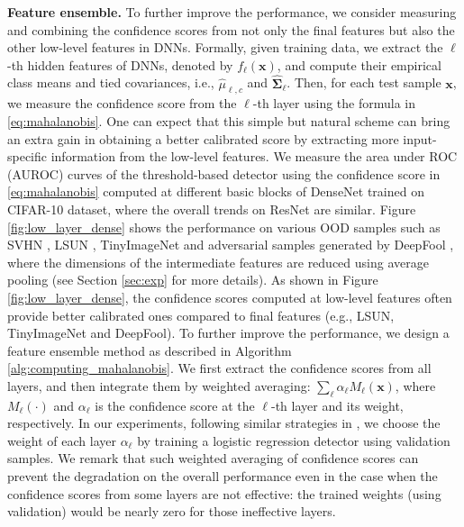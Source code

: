 \documentclass{article}
\begin{document}
{\bf Feature ensemble.}
To further improve the performance,
we consider measuring and combining the confidence scores
from not only the final features but also the other low-level features in DNNs.
Formally, given training data, we extract the $\ell$-th hidden features of DNNs, denoted by $f_{\ell}(\mathbf{x})$, and compute their empirical class means and tied covariances, i.e., ${\widehat \mu}_{\ell,c}$ and $\mathbf{\widehat \Sigma}_\ell$. Then, for each test sample $\mathbf{x}$, we measure the confidence score from the $\ell$-th layer using the formula in \eqref{eq:mahalanobis}.
One can expect that this simple but natural scheme can bring an extra gain in obtaining a better calibrated score by extracting more input-specific information from the low-level features.
We measure the area under ROC (AUROC) curves of the threshold-based detector using the confidence score in \eqref{eq:mahalanobis} computed at different basic blocks of DenseNet \citep{huang2017densely} trained on CIFAR-10 dataset, where the overall trends on ResNet are similar.
Figure \ref{fig:low_layer_dense} shows the performance on various
OOD samples such as {SVHN \citep{netzer2011reading}, LSUN \citep{yu2015lsun}, TinyImageNet 
and adversarial samples generated by DeepFool \citep{moosavi2016deepfool}}, 
where the dimensions of the intermediate features are reduced using average pooling (see Section \ref{sec:exp} for more details).
As shown in Figure \ref{fig:low_layer_dense},
the confidence scores computed at low-level features often provide better calibrated ones compared to final features (e.g., LSUN, TinyImageNet and DeepFool).
To further improve the performance,
we design a feature ensemble method as described in Algorithm \ref{alg:computing_mahalanobis}.
We first extract the confidence scores from all layers, and then integrate them by weighted averaging: $\sum_{\ell} \alpha_\ell M_\ell(\mathbf{x})$, where $M_\ell(\cdot)$ and $\alpha_\ell$ is the confidence score at the $\ell$-th layer and its weight, respectively.
In our experiments, following similar strategies in \citep{ma2018characterizing}, we choose the weight of each layer $\alpha_\ell$ by training a logistic regression detector using validation samples.
We remark that such weighted averaging of confidence scores can prevent the degradation on the overall performance even in the case when the confidence scores from some layers are not effective: the trained weights (using validation) would be nearly zero for those ineffective layers.
\end{document}
